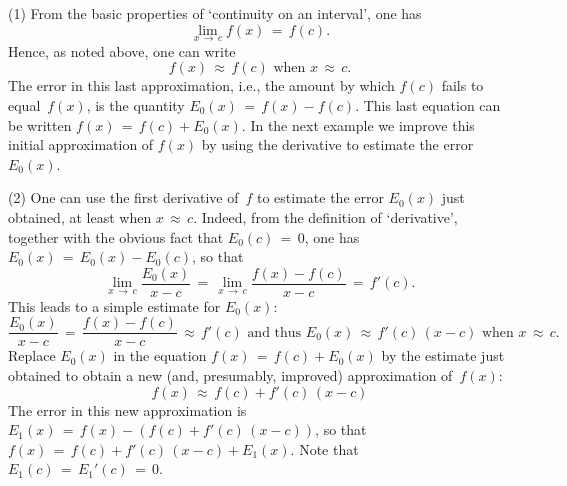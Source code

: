{\V

        (1) From the basic properties of `continuity on an interval', one has
        \begin{displaymath}
        \lim_{x \,{\rightarrow}\, c} f(x) \,=\, f(c).
        \end{displaymath}
    Hence, as noted above, one can write
        \begin{displaymath}
        f(x) \,{\approx}\, f(c) \mbox{ when $x \,{\approx}\, c$}.
        \end{displaymath}
    The error in this last approximation, i.e., the amount by which $f(c)$ fails to equal~$f(x)$, is the quantity $E_{0}(x) \,=\, f(x)-f(c)$.
    This last equation can be written $f(x) \,=\, f(c) + E_{0}(x)$. In the next example we improve this initial approximation of $f(x)$
    by using the derivative to estimate the error~$E_{0}(x)$.

\V

        (2)  One can use the first derivative of~$f$ to estimate the error $E_{0}(x)$ just obtained, at least when $x \,{\approx}\, c$.
    Indeed, from the definition of `derivative', together with the obvious fact that $E_{0}(c) \,=\, 0$, one has $E_{0}(x) \,=\, E_{0}(x) - E_{0}(c)$, so that
        \begin{displaymath}
        \lim_{x \,{\rightarrow}\, c} \frac{E_{0}(x)}{x-c} \,=\, \lim_{x \,{\rightarrow}\, c} \frac{f(x)-f(c)}{x-c} \,=\, f'(c).
        \end{displaymath}
    This leads to a simple estimate for $E_{0}(x)$:
        \begin{displaymath}
        \frac{E_{0}(x)}{x-c} \,=\, \frac{f(x)-f(c)}{x-c}  \,{\approx}\, f'(c) \mbox{ and thus }
        E_{0}(x) \,{\approx}\, f'(c)\,(x-c)  \mbox{ when $x \,{\approx}\, c$}.
        \end{displaymath}
    Replace $E_{0}(x)$ in the equation $f(x) \,=\, f(c) + E_{0}(x)$ by the estimate just obtained
    to obtain a new (and, presumably, improved) approximation of~$f(x)$:
        \begin{displaymath}
        f(x) \,{\approx}\, f(c) + f'(c)\,(x-c)
        \end{displaymath}
    The error in this new approximation is $E_{1}(x) \,=\, f(x) - (f(c) + f'(c)\,(x-c))$, so that $f(x) \,=\, f(c) + f'(c)\,(x-c) + E_{1}(x)$.
    Note that $E_{1}(c) \,=\, E_{1}'(c) \,=\, 0$.

\V

}
